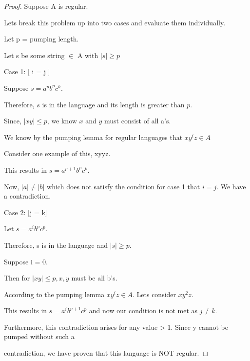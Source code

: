 \documentclass[10pt]{article}
\begin{document}
\begin{proof}[Proof]
Suppose A is regular. \newline

Lets break this problem up into two cases and evaluate them individually. \newline

Let p = pumping length.

Let s be some string $\in$ A with $|s| \geq p$ \newline

Case 1: [ i = j ]\newline


Suppose $s = a^{p}b^{p}c^k$. 

Therefore, $s$ is in the language and its length is greater than $p$.
\newline

Since, $|xy| \leq p$, we know $x$ and $y$ must consist of all a's. \newline

We know by the pumping lemma for regular languages that $xy^iz \in A$

Consider one example of this, xyyz. \newline

This results in $s = a^{p+1}b^pc^k$. \newline

Now, $|a| \neq |b|$ which does not satisfy the condition for case 1 that $i = j$. We have a contradiction. \newline \newline

Case 2:  [j = k] \newline

Let $s = a^ib^pc^p$. 

Therefore, s is in the language and $|s| \geq p$. \newline

Suppose i = 0. 

Then for $|xy| \leq p, x,y$ must be all b's. \newline

According to the pumping lemma $xy^iz \in A$. Lets consider $xy^2z$. \newline

This results in $s = a^ib^{p+1}c^p$ and now our condition is not met as $j \neq k$.

Furthermore, this contradiction arises for any value > 1. Since y cannot be pumped without such a 

contradiction, we have proven that this language is NOT regular. 














\end{proof}
\end{document}
